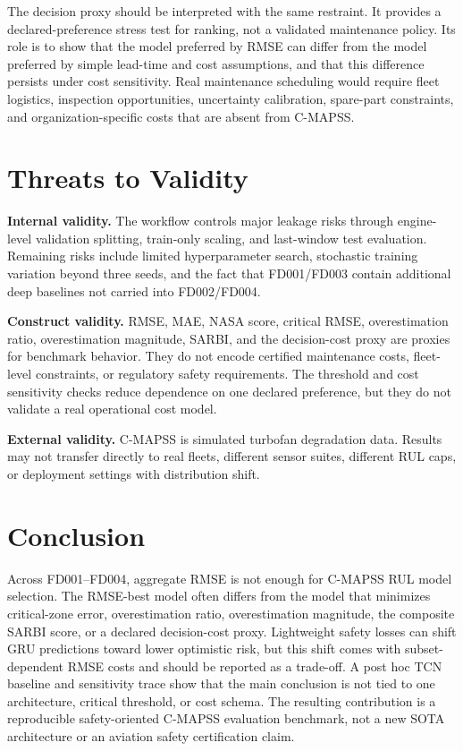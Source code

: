 \documentclass[10pt,twocolumn]{article}
\begin{document}
The decision proxy should be interpreted with the same restraint. It provides a declared-preference stress test for ranking, not a validated maintenance policy. Its role is to show that the model preferred by RMSE can differ from the model preferred by simple lead-time and cost assumptions, and that this difference persists under cost sensitivity. Real maintenance scheduling would require fleet logistics, inspection opportunities, uncertainty calibration, spare-part constraints, and organization-specific costs that are absent from C-MAPSS.

\section{Threats to Validity}

\textbf{Internal validity.} The workflow controls major leakage risks through engine-level validation splitting, train-only scaling, and last-window test evaluation. Remaining risks include limited hyperparameter search, stochastic training variation beyond three seeds, and the fact that FD001/FD003 contain additional deep baselines not carried into FD002/FD004.

\textbf{Construct validity.} RMSE, MAE, NASA score, critical RMSE, overestimation ratio, overestimation magnitude, SARBI, and the decision-cost proxy are proxies for benchmark behavior. They do not encode certified maintenance costs, fleet-level constraints, or regulatory safety requirements. The threshold and cost sensitivity checks reduce dependence on one declared preference, but they do not validate a real operational cost model.

\textbf{External validity.} C-MAPSS is simulated turbofan degradation data. Results may not transfer directly to real fleets, different sensor suites, different RUL caps, or deployment settings with distribution shift.

\section{Conclusion}

Across FD001--FD004, aggregate RMSE is not enough for C-MAPSS RUL model selection. The RMSE-best model often differs from the model that minimizes critical-zone error, overestimation ratio, overestimation magnitude, the composite SARBI score, or a declared decision-cost proxy. Lightweight safety losses can shift GRU predictions toward lower optimistic risk, but this shift comes with subset-dependent RMSE costs and should be reported as a trade-off. A post hoc TCN baseline and sensitivity trace show that the main conclusion is not tied to one architecture, critical threshold, or cost schema. The resulting contribution is a reproducible safety-oriented C-MAPSS evaluation benchmark, not a new SOTA architecture or an aviation safety certification claim.
\end{document}
